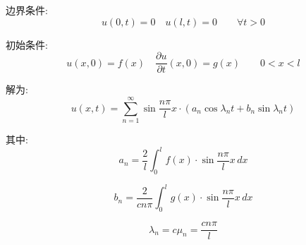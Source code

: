 \documentclass[12pt,a4paper]{article}
\numberwithin{subsection}{section}   %
\numberwithin{subsubsection}{subsection}
\theoremstyle{plain}
\theoremstyle{definition}
\theoremstyle{remark}
\theoremstyle{verification}
\begin{document}
	边界条件:
	\begin{equation}
		u(0, t) = 0 \quad u(l, t) = 0 \qquad \forall t > 0
	\end{equation}
	
	初始条件:
	\begin{equation}
		u(x, 0) = f(x) \quad \frac{\partial u}{\partial t}(x, 0) = g(x) \qquad 0 < x < l
	\end{equation}
	
	解为:
	\begin{equation}
		u(x, t) = \sum_{n=1}^{\infty} \sin \frac{n\pi}{l} x \cdot \left( a_n \cos \lambda_n t + b_n \sin \lambda_n t \right)
	\end{equation}
	
	其中:
	\begin{equation}
		a_n = \frac{2}{l} \int_0^l f(x) \cdot \sin \frac{n\pi}{l} x \, dx
	\end{equation}
	
	\begin{equation}
		b_n = \frac{2}{c n \pi} \int_0^l g(x) \cdot \sin \frac{n\pi}{l} x \, dx
	\end{equation}
	
	\begin{equation}
		\lambda_n = c \mu_n = \frac{c n \pi}{l}
	\end{equation}
	
	
	
\end{document}
